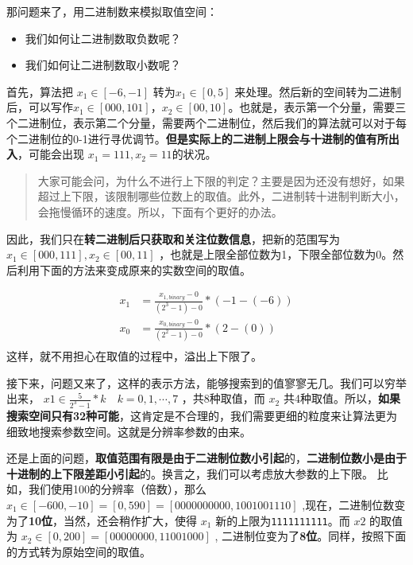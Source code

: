 \documentclass[]{ctexbook}
\providecommand{\tightlist}{%
  \setlength{\itemsep}{0pt}\setlength{\parskip}{0pt}}
\begin{document}
那问题来了，用二进制数来模拟取值空间：

\begin{itemize}
\tightlist
\item
  我们如何让二进制数取负数呢？
\item
  我们如何让二进制数取小数呢？
\end{itemize}

首先，算法把 \(x_1\in[-6,-1]\) 转为\(x_1\in[0,5]\)
来处理。然后新的空间转为二进制后，可以写作\(x_1 \in [000,101]\)，\(x_2 \in [00,10]\)。也就是，表示第一个分量，需要三个二进制位，表示第二个分量，需要两个二进制位，然后我们的算法就可以对于每个二进制位的0-1进行寻优调节。\textbf{但是实际上的二进制上限会与十进制的值有所出入}，可能会出现
\(x_1 = 111, x_2 = 11\)的状况。

\begin{quote}
大家可能会问，为什么不进行上下限的判定？主要是因为还没有想好，如果超过上下限，该限制哪些位数上的取值。此外，二进制转十进制判断大小，会拖慢循环的速度。所以，下面有个更好的办法。
\end{quote}

因此，我们只在\textbf{转二进制后只获取和关注位数信息}，把新的范围写为
\(x_1\in[000,111], x_2\in[00,11]\)
，也就是上限全部位数为1，下限全部位数为0。然后利用下面的方法来变成原来的实数空间的取值。

\[
\begin{aligned}
x_1 &= \frac{x_{1,binary}-0}{(2^3-1)-0} * (-1-(-6))\\
x_0 &= \frac{x_{0,binary}-0}{(2^2-1)-0} * (2-(0))\\
\end{aligned}
\] 这样，就不用担心在取值的过程中，溢出上下限了。

接下来，问题又来了，这样的表示方法，能够搜索到的值寥寥无几。我们可以穷举出来，
\(x1\in\frac{5}{2^3-1}*k\quad k=0,1,\cdots,7\) ，共8种取值，而 \(x_2\)
共4种取值。所以，\textbf{如果搜索空间只有32种可能}，这肯定是不合理的，我们需要更细的粒度来让算法更为细致地搜索参数空间。这就是分辨率参数的由来。

还是上面的问题，\textbf{取值范围有限是由于二进制位数小引起}的，\textbf{二进制位数小是由于十进制的上下限差距小引起}的。换言之，我们可以考虑放大参数的上下限。
比如，我们使用100的分辨率（倍数），那么
\(x_1\in[-600,-10] = [0,590] = [0000000000,1001001110]\)
,现在，二进制位数变为了\textbf{10位}，当然，还会稍作扩大，使得 \(x_1\)
新的上限为\texttt{1111111111}。而 \(x2\) 的取值为
\(x_2\in[0,200]=[00000000,11001000]\) ,
二进制位变为了\textbf{8位}。同样，按照下面的方式转为原始空间的取值。
\end{document}
